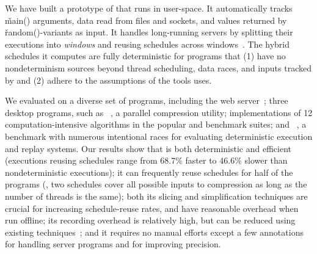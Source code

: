 


We have built a prototype of \peregrine that runs in user-space.
It automatically tracks \v{main()}
arguments, data read from files and sockets, and values
returned by \v{random()}-variants as input.  It handles long-running servers by
splitting their executions into \emph{windows} and
reusing schedules across windows~\cite{cui:tern:osdi10}.
The hybrid schedules it computes are fully deterministic for programs that
(1) have no nondeterminism sources beyond thread scheduling, data races, and
inputs tracked by \peregrine and (2) adhere to the assumptions of the tools \peregrine
uses.

We evaluated \peregrine on a diverse set of \nprog programs, including the
\apache web server~\cite{apache}; three desktop programs, such as
\pbzip~\cite{pbzip2}, a parallel compression utility; implementations of
12 computation-intensive algorithms in the popular \splash and \parsec
benchmark suites; and \racey~\cite{racy-stress}, a benchmark with numerous
intentional races for evaluating deterministic execution and replay
systems.  Our results show that \peregrine is both deterministic and efficient
(executions reusing schedules range from 68.7\% faster to 46.6\% slower
than nondeterministic executions); it can frequently reuse schedules for
half of the programs (\eg, two schedules cover all possible inputs to
\pbzip compression as long as the number of threads is the same); both its slicing and
simplification techniques are crucial for increasing schedule-reuse rates,
and have reasonable overhead when run offline; its recording overhead
is relatively high, but can be reduced using existing
techniques~\cite{idna:vee06}; and it requires no manual efforts except a
few annotations for handling server programs and for improving precision.


